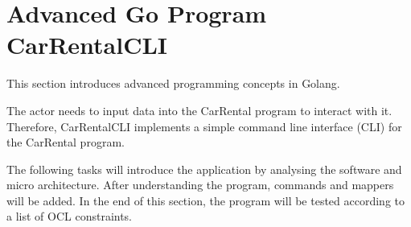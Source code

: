 




\section{Advanced Go Program CarRentalCLI}
\label{sec:advanced_go_program_car_rental_cli}
This section introduces advanced programming concepts in Golang.

The actor needs to input data into the CarRental program to interact with it.
Therefore, CarRentalCLI implements a simple command line interface (CLI) for the CarRental program.

The following tasks will introduce the application by analysing the software and micro architecture.
After understanding the program, commands and mappers will be added.
In the end of this section, the program will be tested according to a list of OCL constraints.




